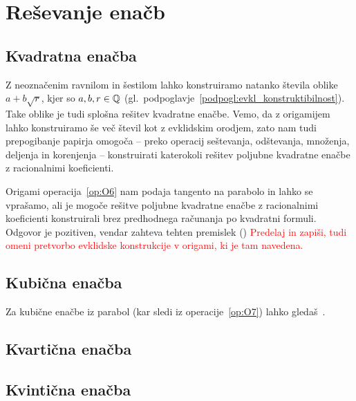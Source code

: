 \section{Reševanje enačb}
\label{pogl:enacbe}



\subsection{Kvadratna enačba}

Z neoznačenim ravnilom in šestilom  lahko konstruiramo natanko števila oblike $a + b\sqrt{r}$, kjer so $a, b, r \in \mathbb Q$ (gl.\ podpoglavje~\ref{podpogl:evkl_konstruktibilnost}). Take oblike je tudi splošna rešitev kvadratne enačbe. Vemo, da z origamijem lahko konstruiramo še več števil kot z evklidskim orodjem, zato nam tudi prepogibanje papirja omogoča -- preko operacij seštevanja, odštevanja, množenja, deljenja in korenjenja -- konstruirati katerokoli rešitev poljubne kvadratne enačbe z racionalnimi koeficienti.

Origami operacija~\ref{op:O6} nam podaja tangento na parabolo in lahko se vprašamo, ali je mogoče rešitve poljubne kvadratne enačbe z racionalnimi koeficienti konstruirali brez predhodnega računanja po kvadratni formuli. Odgovor je pozitiven, vendar zahteva tehten premislek (\cite[str.\ 36--38]{hull2020}) \textcolor{red}{Predelaj in zapiši, tudi omeni pretvorbo evklidske konstrukcije v origami, ki je tam navedena.}

\subsection{Kubična enačba}

Za kubične enačbe iz parabol (kar sledi iz operacije~\ref{op:O7}) lahko gledaš~\cite[str.\ 150]{geometricconstructions}.

\subsection{Kvartična enačba}

\subsection{Kvintična enačba}